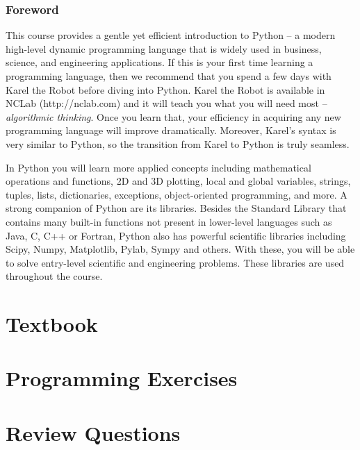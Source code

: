 \documentclass[article,A4,12pt]{llncs}
\begin{document}
\pagestyle{plain}
\setcounter{page}{1}

\pagestyle{plain}
\setcounter{page}{1}
\section*{Foreword}
This course provides a gentle yet efficient introduction to Python -- 
a modern high-level dynamic programming language that is widely used in business, 
science, and engineering applications. If this is your first time learning 
a programming language, then we recommend that you spend a few days with 
Karel the Robot before diving into Python. Karel the Robot is available 
in NCLab (http://nclab.com) and it will teach you what you will need most --
{\em algorithmic 
thinking}. Once you learn that, your efficiency in acquiring any new programming language
will improve dramatically. Moreover, Karel's syntax is very similar to Python, 
so the transition from Karel to Python is truly seamless.

In Python you will learn more applied concepts including mathematical operations
and functions, 2D and 3D plotting, local and global variables, strings, tuples, lists, dictionaries, 
exceptions, object-oriented programming, and more. 
A strong companion of Python are its libraries. Besides the Standard Library that
contains many built-in functions not present in lower-level languages such as 
Java, C, C++ or Fortran, Python also has powerful scientific libraries including 
Scipy, Numpy, Matplotlib, Pylab, Sympy and others. With these, you will be able to 
solve entry-level scientific and engineering problems. These libraries are used
throughout the course.  


\part{Textbook}

\setcounter{section}{0}




\part{Programming Exercises}

\setcounter{section}{0}




\part{Review Questions}


\end{document}
